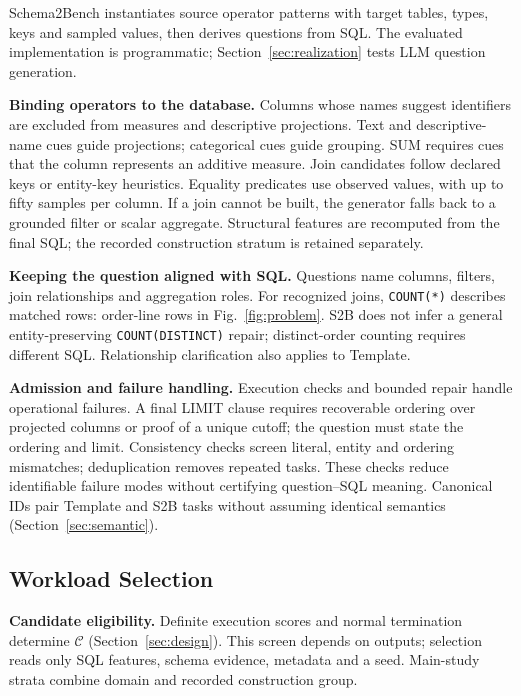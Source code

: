 Schema2Bench instantiates source operator patterns with target tables, types, keys and sampled values, then derives questions from SQL. The evaluated implementation is programmatic; Section~\ref{sec:realization} tests LLM question generation.

\textbf{Binding operators to the database.} Columns whose names suggest identifiers are excluded from measures and descriptive projections. Text and descriptive-name cues guide projections; categorical cues guide grouping. SUM requires cues that the column represents an additive measure. Join candidates follow declared keys or entity-key heuristics. Equality predicates use observed values, with up to fifty samples per column. If a join cannot be built, the generator falls back to a grounded filter or scalar aggregate. Structural features are recomputed from the final SQL; the recorded construction stratum is retained separately.

\textbf{Keeping the question aligned with SQL.} Questions name columns, filters, join relationships and aggregation roles. For recognized joins, \texttt{COUNT(*)} describes matched rows: order-line rows in Fig.~\ref{fig:problem}. S2B does not infer a general entity-preserving \texttt{COUNT(DISTINCT)} repair; distinct-order counting requires different SQL. Relationship clarification also applies to Template.

\textbf{Admission and failure handling.} Execution checks and bounded repair handle operational failures. A final LIMIT clause requires recoverable ordering over projected columns or proof of a unique cutoff; the question must state the ordering and limit. Consistency checks screen literal, entity and ordering mismatches; deduplication removes repeated tasks. These checks reduce identifiable failure modes without certifying question--SQL meaning. Canonical IDs pair Template and S2B tasks without assuming identical semantics (Section~\ref{sec:semantic}).


\subsection{Workload Selection}\label{sec:quota-release}

\textbf{Candidate eligibility.} Definite execution scores and normal termination determine $\mathcal C$ (Section~\ref{sec:design}). This screen depends on outputs; selection reads only SQL features, schema evidence, metadata and a seed. Main-study strata combine domain and recorded construction group.

